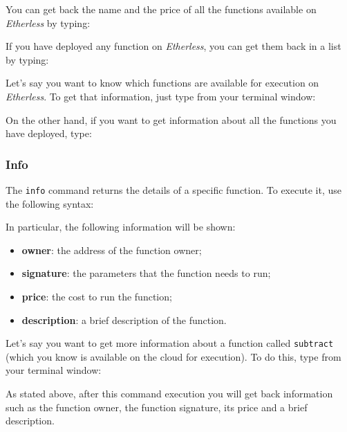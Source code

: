 You can get back the name and the price of all the functions available on \textit{Etherless} by typing:
\begin{center}
\end{center}

If you have deployed any function on \textit{Etherless}, you can get them back in a list by typing:
\begin{center}
\end{center}

Let's say you want to know which functions are available for execution on \textit{Etherless}. To get that information, just type from your terminal window:
\begin{center}
\end{center}
On the other hand, if you want to get information about all the functions you have deployed, type:
\begin{center}
\end{center}

\subsubsection{Info}
The \texttt{info} command returns the details of a specific function. To execute it, use the following syntax: \\
\begin{center}
\end{center}
In particular, the following information will be shown:
\begin{itemize}
	\item \textbf{owner}: the address of the function owner;
	\item \textbf{signature}: the parameters that the function needs to run;
	\item \textbf{price}: the cost to run the function;
	\item \textbf{description}: a brief description of the function.
\end{itemize}
Let's say you want to get more information about a function called \texttt{subtract} (which you know is available on the cloud for execution). To do this, type from your terminal window:
\begin{center}
\end{center}
As stated above, after this command execution you will get back information such as the function owner, the function signature, its price and a brief description.

